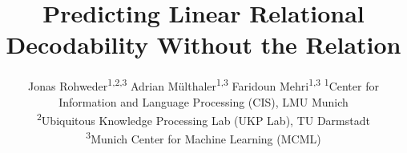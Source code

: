 \title{\centering Predicting Linear Relational\\Decodability Without the Relation}
\newlength{\arxivauthorsep}
\setlength{\arxivauthorsep}{\dimexpr(\textwidth-2\tabcolsep-\arxivauthorsep)/2\relax}
\author{%
Jonas Rohweder\textsuperscript{1,2,3} \And
Adrian M{\"u}lthaler\textsuperscript{1,3} \And
Faridoun Mehri\textsuperscript{1,3} \AND
{} \AND
\normalfont
\textsuperscript{1}Center for Information and Language Processing (CIS), LMU Munich\\
\textsuperscript{2}Ubiquitous Knowledge Processing Lab (UKP Lab), TU Darmstadt\\
\textsuperscript{3}Munich Center for Machine Learning (MCML)%
}
